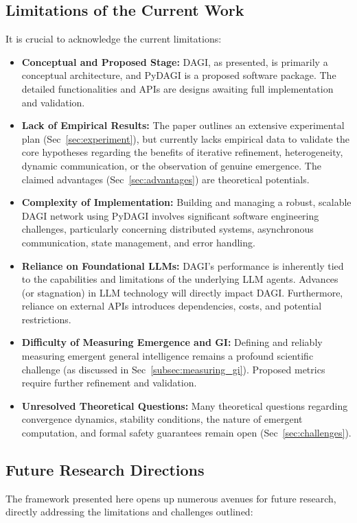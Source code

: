 \documentclass[12pt]{amsart}
\begin{document}
\subsection{Limitations of the Current Work}
It is crucial to acknowledge the current limitations:
\begin{itemize}[leftmargin=*]
    \item \textbf{Conceptual and Proposed Stage:} DAGI, as presented, is primarily a conceptual architecture, and PyDAGI is a proposed software package. The detailed functionalities and APIs are designs awaiting full implementation and validation.
    \item \textbf{Lack of Empirical Results:} The paper outlines an extensive experimental plan (Sec~\ref{sec:experiment}), but currently lacks empirical data to validate the core hypotheses regarding the benefits of iterative refinement, heterogeneity, dynamic communication, or the observation of genuine emergence. The claimed advantages (Sec~\ref{sec:advantages}) are theoretical potentials.
    \item \textbf{Complexity of Implementation:} Building and managing a robust, scalable DAGI network using PyDAGI involves significant software engineering challenges, particularly concerning distributed systems, asynchronous communication, state management, and error handling.
    \item \textbf{Reliance on Foundational LLMs:} DAGI's performance is inherently tied to the capabilities and limitations of the underlying LLM agents. Advances (or stagnation) in LLM technology will directly impact DAGI. Furthermore, reliance on external APIs introduces dependencies, costs, and potential restrictions.
    \item \textbf{Difficulty of Measuring Emergence and GI:} Defining and reliably measuring emergent general intelligence remains a profound scientific challenge (as discussed in Sec~\ref{subsec:measuring_gi}). Proposed metrics require further refinement and validation.
    \item \textbf{Unresolved Theoretical Questions:} Many theoretical questions regarding convergence dynamics, stability conditions, the nature of emergent computation, and formal safety guarantees remain open (Sec~\ref{sec:challenges}).
\end{itemize}

\subsection{Future Research Directions}
The framework presented here opens up numerous avenues for future research, directly addressing the limitations and challenges outlined:
\end{document}
